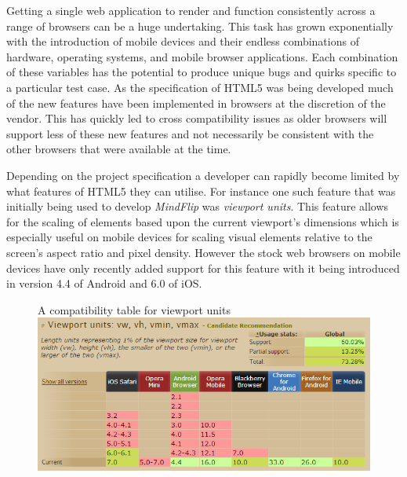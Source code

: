 \documentclass[final]{cmpreport}
\begin{document}

Getting a single web application to render and function consistently across a range of browsers can be a huge undertaking. This task has grown exponentially with the introduction of mobile devices and their endless combinations of hardware, operating systems, and mobile browser applications. Each combination of these variables has the potential to produce unique bugs and quirks specific to a particular test case. As the specification of HTML5 was being developed much of the new features have been implemented in browsers at the discretion of the vendor. This has quickly led to cross compatibility issues as older browsers will support less of these new features and not necessarily be consistent with the other browsers that were available at the time.

Depending on the project specification a developer can rapidly become limited by what features of HTML5 they can utilise. For instance one such feature that was initially being used to develop \textit{MindFlip} was \textit{viewport units}. This feature allows for the scaling of elements based upon the current viewport's dimensions which is especially useful on mobile devices for scaling visual elements relative to the screen's aspect ratio and pixel density. However the stock web browsers on mobile devices have only recently added support for this feature with it being introduced in version 4.4 of Android and 6.0 of iOS.

\begin{figure}[h]{A compatibility table for viewport units \label{viewport}}
  \includegraphics[width=1.0\textwidth]{viewport-units.png}
\end{figure}
\end{document}
